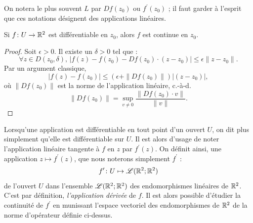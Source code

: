 


On notera le plus souvent $L$ par $Df(z_0)$ ou $f^\prime(z_0)$ ; il faut garder à l'esprit que ces notations désignent des applications linéaires.
%
\begin{fprop}\label{prop:1.1}
Si $f \colon U \to \mathbb R^2$ est différentiable en $z_0$, alors $f$ est continue en $z_0$.
\end{fprop}
\begin{proof}
Soit $\epsilon > 0$. Il existe un $\delta >0$ tel que :
\[ \forall z \in D(z_0,\delta), \, \lvert f(z) - f(z_0) -Df(z_0)\cdot(z-z_0) \rvert \leq \epsilon \|z-z_0\|.\]
Par un argument classique,
\[\lvert f(z) -f(z_0)\rvert \leq \left(\epsilon + \|Df(z_0)\| \right)\lvert (z-z_0) \rvert,\]
où $\|Df(z_0)\|$ est la norme de l'application linéaire, c.-à-d. 
\[ \|Df(z_0)\| = \sup_{v \neq 0} \frac{\|Df(z_0) \cdot v\|}{\|v\|}.\]
\end{proof}

Lorsqu'une application est différentiable en tout point d'un ouvert $U$, on dit plus simplement qu'elle est différentiable sur $U$. Il est alors d'usage de noter l'application linéaire tangente à $f$ en $z$ par $f^\prime(z)$. On définit ainsi, une application $z \mapsto f^\prime(z)$, que nous noterons simplement $f^\prime$ : 
\[ f^\prime \colon  U \mapsto \mathcal{L}(\mathbb R^2 ; \mathbb R^2)\]
de l'ouvert $U$ dans l'ensemble $\mathcal{L}(\mathbb R^2 ; \mathbb R^2)$ des endomorphismes linéaires de $\mathbb R^2$. C'est par définition, \textit{l'application dérivée} de $f$. Il est alors possible d'étudier la continuité de $f^\prime$ en munissant l'espace vectoriel des endomorphismes de $\mathbb R^2$ de la norme d'opérateur définie ci-dessus.


